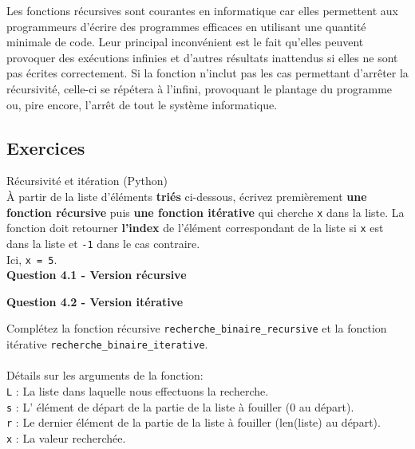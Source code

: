     Les fonctions récursives sont courantes en informatique car elles permettent aux programmeurs d'écrire des programmes efficaces en utilisant une quantité minimale de code. Leur principal inconvénient est le fait qu'elles peuvent provoquer des exécutions infinies et d'autres résultats inattendus si elles ne sont pas écrites correctement. Si la fonction n'inclut pas les cas permettant d'arrêter la récursivité, celle-ci se répétera à l'infini, provoquant le plantage du programme ou, pire encore, l'arrêt de tout le système informatique.\\
       
    \subsection{Exercices}
    
    \begin{Exercice}[20 minutes] Récursivité et itération (Python)\\
    
    À partir de la liste d'éléments \textbf{triés} ci-dessous, écrivez premièrement \textbf{une fonction récursive} puis \textbf{une fonction itérative} qui cherche \lstinline{x} dans la liste. La fonction doit retourner \textbf{l'index} de l'élément correspondant de la liste si \lstinline{x} est dans la liste et \lstinline{-1} dans le cas contraire.\\
    Ici, \lstinline{x = 5}.\\
    
    \textbf{Question 4.1 - Version récursive}
    
    
    \textbf{Question 4.2 - Version itérative}
    
    
    
        \begin{conseil}
            Complétez la fonction récursive \lstinline{recherche_binaire_recursive} et la fonction itérative \lstinline{recherche_binaire_iterative}.\\\\
            Détails sur les arguments de la fonction:\\
            \lstinline{L} : La liste dans laquelle nous effectuons la recherche.\\
            \lstinline{s} : L' élément de départ de la partie de la liste à fouiller (0 au départ).\\
            \lstinline{r} : Le dernier élément de la partie de la liste à fouiller (len(liste) au départ).\\
            \lstinline{x} : La valeur recherchée.\\
    

\end{conseil}
\end{Exercice}
